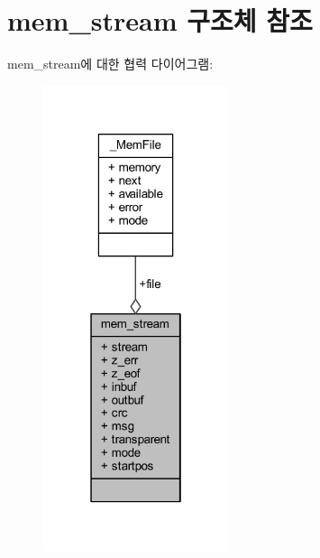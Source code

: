 \hypertarget{structmem__stream}{}\section{mem\+\_\+stream 구조체 참조}
\label{structmem__stream}


mem\+\_\+stream에 대한 협력 다이어그램\+:\nopagebreak
\begin{figure}[H]
\begin{center}
\leavevmode
\includegraphics[width=154pt]{structmem__stream__coll__graph}
\end{center}
\end{figure}

